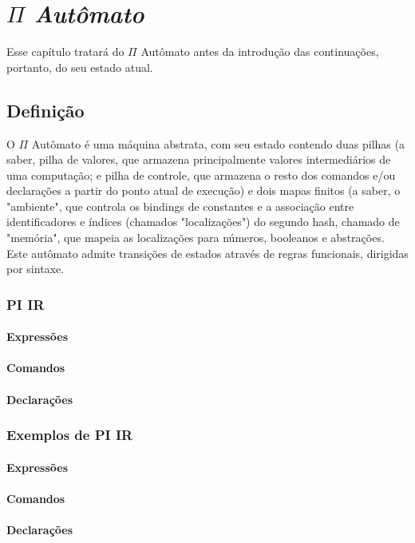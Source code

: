 \chapter{\textit{$\Pi$ Autômato}}\label{cap2}
Esse capítulo tratará do $\Pi$ Autômato antes da introdução das continuações, portanto, do seu estado atual.
\section{Definição}
O $\Pi$ Autômato é uma máquina abstrata, com seu estado contendo duas pilhas (a saber, pilha de valores, que armazena principalmente valores intermediários de uma computação; e pilha de controle, que armazena o resto dos comandos e/ou declarações a partir do ponto atual de execução) e dois mapas finitos (a saber, o "ambiente", que controla os bindings de constantes e a associação entre identificadores e índices (chamados "localizações") do segundo hash, chamado de "memória", que mapeia as localizações para números, booleanos e abstrações. Este autômato admite transições de estados através de regras funcionais, dirigidas por sintaxe.
\subsection{PI IR}

\subsubsection{Expressões}
\subsubsection{Comandos}
\subsubsection{Declarações}

\subsection{Exemplos de PI IR}
\subsubsection{Expressões}
\subsubsection{Comandos}
\subsubsection{Declarações}\label{declarações}